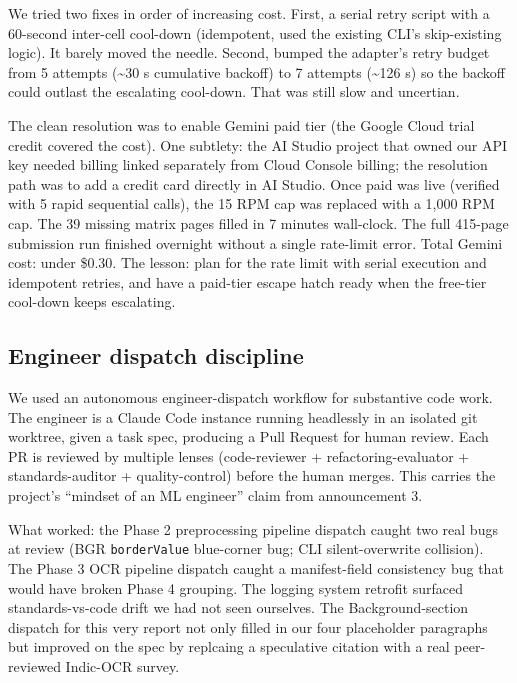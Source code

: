 \documentclass[
  letterpaper,
  DIV=11,
  numbers=noendperiod]{scrartcl}
\begin{document}
We tried two fixes in order of increasing cost. First, a serial retry
script with a 60-second inter-cell cool-down (idempotent, used the
existing CLI's skip-existing logic). It barely moved the needle. Second,
bumped the adapter's retry budget from 5 attempts (\textasciitilde30 s
cumulative backoff) to 7 attempts (\textasciitilde126 s) so the backoff
could outlast the escalating cool-down. That was still slow and
uncertian.

The clean resolution was to enable Gemini paid tier (the Google Cloud
trial credit covered the cost). One subtlety: the AI Studio project that
owned our API key needed billing linked separately from Cloud Console
billing; the resolution path was to add a credit card directly in AI
Studio. Once paid was live (verified with 5 rapid sequential calls), the
15 RPM cap was replaced with a 1,000 RPM cap. The 39 missing matrix
pages filled in 7 minutes wall-clock. The full 415-page submission run
finished overnight without a single rate-limit error. Total Gemini cost:
under \$0.30. The lesson: plan for the rate limit with serial execution
and idempotent retries, and have a paid-tier escape hatch ready when the
free-tier cool-down keeps escalating.

\subsection{Engineer dispatch
discipline}\label{engineer-dispatch-discipline}

We used an autonomous engineer-dispatch workflow for substantive code
work. The engineer is a Claude Code instance running headlessly in an
isolated git worktree, given a task spec, producing a Pull Request for
human review. Each PR is reviewed by multiple lenses (code-reviewer +
refactoring-evaluator + standards-auditor + quality-control) before the
human merges. This carries the project's ``mindset of an ML engineer''
claim from announcement 3.

What worked: the Phase 2 preprocessing pipeline dispatch caught two real
bugs at review (BGR \texttt{borderValue} blue-corner bug; CLI
silent-overwrite collision). The Phase 3 OCR pipeline dispatch caught a
manifest-field consistency bug that would have broken Phase 4 grouping.
The logging system retrofit surfaced standards-vs-code drift we had not
seen ourselves. The Background-section dispatch for this very report not
only filled in our four placeholder paragraphs but improved on the spec
by replcaing a speculative citation with a real peer-reviewed Indic-OCR
survey.
\end{document}
